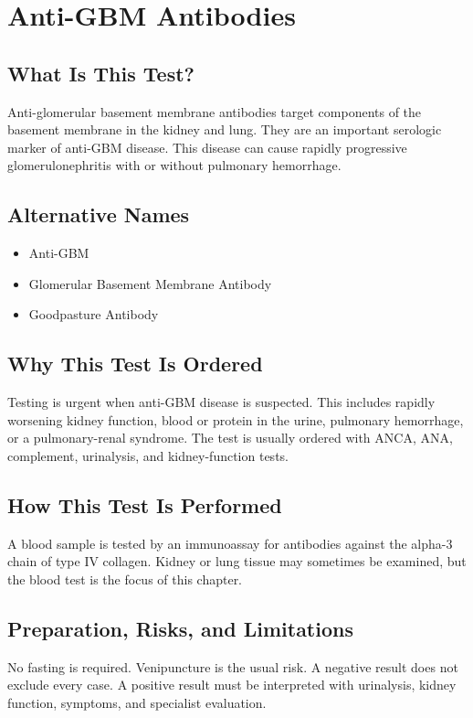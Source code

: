 \chapter{Anti-GBM Antibodies}

\section*{What Is This Test?}
Anti-glomerular basement membrane antibodies target components of the basement membrane in the kidney and lung. They are an important serologic marker of anti-GBM disease. This disease can cause rapidly progressive glomerulonephritis with or without pulmonary hemorrhage.

\section*{Alternative Names}
\begin{itemize}
  \item Anti-GBM
  \item Glomerular Basement Membrane Antibody
  \item Goodpasture Antibody
\end{itemize}
\section*{Why This Test Is Ordered}
Testing is urgent when anti-GBM disease is suspected. This includes rapidly worsening kidney function, blood or protein in the urine, pulmonary hemorrhage, or a pulmonary-renal syndrome. The test is usually ordered with ANCA, ANA, complement, urinalysis, and kidney-function tests.

\section*{How This Test Is Performed}
A blood sample is tested by an immunoassay for antibodies against the alpha-3 chain of type IV collagen. Kidney or lung tissue may sometimes be examined, but the blood test is the focus of this chapter.

\section*{Preparation, Risks, and Limitations}
No fasting is required. Venipuncture is the usual risk. A negative result does not exclude every case. A positive result must be interpreted with urinalysis, kidney function, symptoms, and specialist evaluation.

